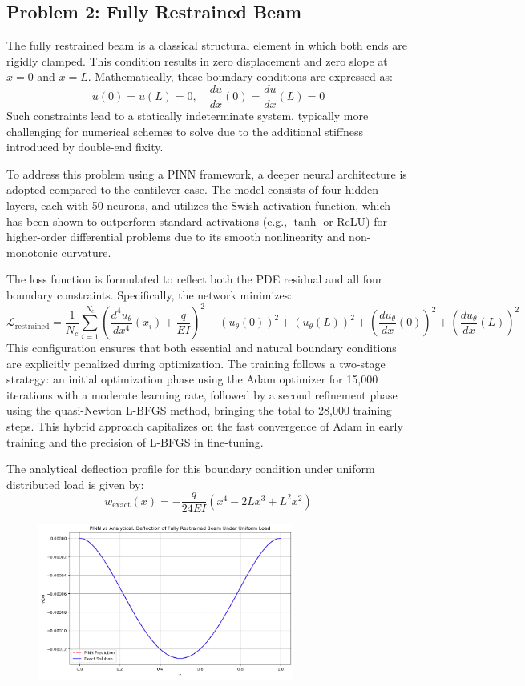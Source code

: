 \documentclass[12pt]{article}
\begin{document}
\subsection{Problem 2: Fully Restrained Beam}

The fully restrained beam is a classical structural element in which both ends are rigidly clamped. This condition results in zero displacement and zero slope at $x=0$ and $x=L$. Mathematically, these boundary conditions are expressed as:
\[
u(0) = u(L) = 0, \quad \frac{du}{dx}(0) = \frac{du}{dx}(L) = 0
\]
Such constraints lead to a statically indeterminate system, typically more challenging for numerical schemes to solve due to the additional stiffness introduced by double-end fixity.

To address this problem using a PINN framework, a deeper neural architecture is adopted compared to the cantilever case. The model consists of four hidden layers, each with 50 neurons, and utilizes the Swish activation function, which has been shown to outperform standard activations (e.g., $\tanh$ or ReLU) for higher-order differential problems due to its smooth nonlinearity and non-monotonic curvature.

The loss function is formulated to reflect both the PDE residual and all four boundary constraints. Specifically, the network minimizes:
\[
\mathcal{L}_{\text{restrained}} = \frac{1}{N_c}\sum_{i=1}^{N_c} \left( \frac{d^4u_\theta}{dx^4}(x_i) + \frac{q}{EI} \right)^2 + 
\left(u_\theta(0)\right)^2 + \left(u_\theta(L)\right)^2 +
\left(\frac{du_\theta}{dx}(0)\right)^2 + \left(\frac{du_\theta}{dx}(L)\right)^2
\]
This configuration ensures that both essential and natural boundary conditions are explicitly penalized during optimization. The training follows a two-stage strategy: an initial optimization phase using the Adam optimizer for 15,000 iterations with a moderate learning rate, followed by a second refinement phase using the quasi-Newton L-BFGS method, bringing the total to 28,000 training steps. This hybrid approach capitalizes on the fast convergence of Adam in early training and the precision of L-BFGS in fine-tuning.

The analytical deflection profile for this boundary condition under uniform distributed load is given by:
\[
w_{\text{exact}}(x) = -\frac{q}{24EI}(x^4 - 2Lx^3 + L^2x^2)
\]

\begin{figure}[htbp]
    \centering
    \includegraphics[width=0.75\textwidth]{restrained_results.png}
    \caption{}
    \label{fig:restrained results}
\end{figure}
\end{document}
